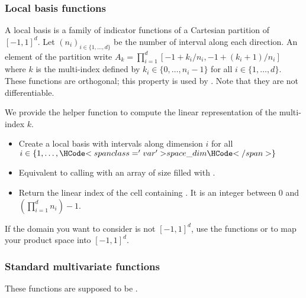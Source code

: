 \subsubsection{Local basis functions}

A local basis is a family of indicator functions of a Cartesian partition of ${[-1,1]}^d$. Let $(n_i)_{i \in \{1, \dots, d\}}$ be the number of interval along each direction. An element of the partition write $A_k = \prod_{i=1}^d [-1 + k_i/n_i, -1 + (k_i + 1) / n_i]$ where $k$ is the multi-index defined by $k_i \in \{0, \dots, n_i - 1\}$ for all $i\in \{1,\dots, d\}$. These functions are orthogonal; this property is used by . Note that they are not differentiable.

We provide the helper function  to compute the linear representation of the multi-index $k$.

\begin{itemize}
  \item {}
  \sshortdescribe Create a local basis with  intervals along dimension $i$ for all $i \in \{1, \dots, \var{space\_dim}\}$
  \item {}
  \sshortdescribe Equivalent to calling  with an array of size  filled with .
  \item {}
  \sshortdescribe Return the linear index of the cell containing . It is an integer between $0$ and $(\prod_{i=1}^d n_i) - 1$.
\end{itemize}

If the domain you want to consider is not ${[-1,1]}^d$, use the functions  or  to map your product space into ${[-1,1]}^d$.

\subsubsection{Standard multivariate functions}

These functions are supposed to be .

